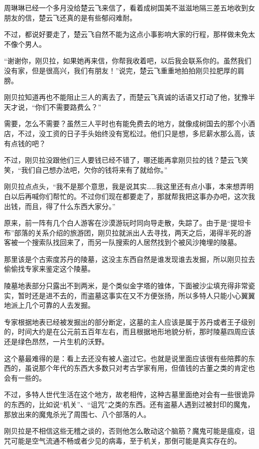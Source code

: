 周琳琳已经一个多月没给楚云飞来信了，看着成树国美不滋滋地隔三差五地收到女朋友的信，楚云飞还真的是有些郁闷难耐。

不过，都说好要走了，楚云飞自然不能为这点小事影响大家的行程，那样做未免太不像个男人。

“谢谢你，刚贝拉，如果她再来信，你帮我收着吧，以后我会联系你的。虽然我们没有家，但是很高兴，我们有朋友！”说完，楚云飞重重地拍拍刚贝拉肥厚的肩膀。

刚贝拉知道再也不能阻止三人的离去了，而楚云飞真诚的话语又打动了他，犹豫半天才说，“你们不需要路费么？”

需要，怎么不需要？虽然三人平时也有能免费去的地方，就像成树国去的那个小酒店，不过，没工资的日子手头始终没有宽松过。他们只是想，多尼薪水那么高，该有点钱的吧？

不过，刚贝拉没跟他们三人要钱已经不错了，哪还能再拿刚贝拉的钱？楚云飞笑笑，“我们自己想办法吧，欠你的钱将来有了就给你。”

刚贝拉点点头，“我不是那个意思，我是说其实……我这里还有点小事，本来想弄明白以后再喊你们帮忙的。不过你们现在都要走了，那就帮我把这事办办吧，这次我出钱，而且，得了什么东西大家分。”

原来，前一阵有几个白人游客在沙漠游玩时同向导走散，失踪了。由于是“提坦卡布”部落的关系介绍的旅游团，刚贝拉就派出人去寻找，两天之后，渴得半死的游客被一个搜索队找回来了，而另一队搜索的人居然找到个被风沙掩埋的陵墓。

那里该是个古索度苏丹的陵墓，这没主东西自然是谁发现谁去发掘，所以刚贝拉去偷偷找专家来鉴定这个陵墓。

陵墓地表部分只露出不到两米，是个类似金字塔的锥体，下面被沙尘填充得非常瓷实，暂时还是进不去的，而盗墓这事实在又不方便张扬，所以多特人只能小心翼翼地派上几个可靠的人去发掘。

专家根据地表已经被发掘出的部分断定，这墓的主人应该是属于苏丹或者王子级别的，时间大约是在公元前五百年左右，而且根据地形地貌分析，那时陵墓四周应该还是绿色昂然，一片生机的沃野。

这个墓最难得的是：看上去还没有被人盗过它。也就是说里面应该很有些陪葬的东西的，虽说那个年代的东西大多数只对考古学家有用，但值钱的古董之类的肯定也会有一些的。

不过，多特人世代生活在这个地方，故老相传，这种古墓里面绝对会有一些很诡异的东西的，比如说“机关”、“诅咒”之类的东西。还有盗墓人遇到过被封印的魔鬼，那放出来的魔鬼杀光了周围七、八个部落的人。

刚贝拉是不相信这些无稽之谈的，否则他怎么敢动这个脑筋？魔鬼可能是瘟疫，诅咒可能是空气流通不畅或者少见的病毒，至于机关，那倒可能是真实存在的。

